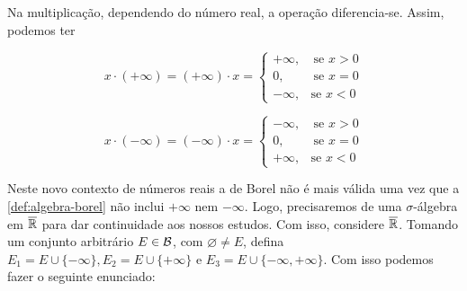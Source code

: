 	\vspace{-0.4cm}
    Na multiplicação, dependendo do número real, a operação diferencia-se.
    Assim, podemos ter
    \vspace{-1cm}
    \begin{multicols}{2}
    $$
    x \cdot (+\infty) = (+\infty) \cdot x =
    \left\{\begin{array}{cc}
          +\infty, & \ \textrm{se } x > 0\\
          0, & \ \textrm{se } x = 0\\
          - \infty, & \textrm{se } x < 0
    \end{array}\right.
    $$
    
    $$
    x \cdot (-\infty) = (-\infty) \cdot x =
    \left\{\begin{array}{cc}
          -\infty, & \ \textrm{se } x > 0\\
          0, & \ \textrm{se } x = 0\\
          + \infty, & \textrm{se } x < 0
    \end{array}\right.
    $$  
    \end{multicols}
	\vspace{-0.4cm}
    Neste novo contexto de números reais a \sigal de Borel não é mais válida uma vez que a \ref{def:algebra-borel} não inclui $+\infty$ nem $-\infty$.
    Logo, precisaremos de uma $\sigma$-álgebra em $\operatorname{\overline{\mathbb{R}}}$ para dar continuidade aos nossos estudos. 
    Com isso, considere $\operatorname{\overline{\mathbb{R}}}$.
    Tomando um conjunto arbitrário $E \in \operatorname{\mathcal{B}}$, com $\varnothing \neq E$, defina $E_1 = E \cup \{-\infty\}, E_2 = E \cup \{+\infty\}$ e $E_3 = E \cup \{-\infty, +\infty\}$. Com isso podemos fazer o seguinte enunciado: 
    \begin{comment}
    Com efeito, se $E \in \borel$, então é um intervalo aberto conforme o teorema \ref{teo:equiv-borel}.
    Assim, $E_1, E_2, E_3$ e $E_4$ serão intervalos do tipo $[-\infty,x)$ ou $(x, +\infty]$ que são elementos de $\borel$ acrescidos de $+\infty$ ou $-\infty$. 
    Deste modo, é fácil verificar que se um elemento $A \in \xborel$, então $A^c \in \xborel$.
    Além disso, a união enumerável é, no máximo, o intervalo $[-\infty,+\infty]$ que é exatamente $\xreta$.
    Desta forma, $\xborel$ é uma \sigal de $\xreta$.
    	
    \end{comment}
    
